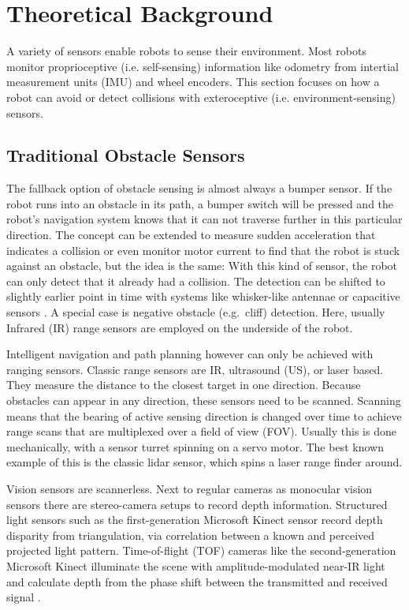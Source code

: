 
\chapter{Theoretical Background}\label{theoretical-background}

A variety of sensors enable robots to sense their environment. Most robots monitor proprioceptive (i.e. self-sensing) information like odometry from intertial measurement units (IMU) and wheel encoders. This section focuses on how a robot can avoid or detect collisions with exteroceptive (i.e. environment-sensing) sensors.

\section{Traditional Obstacle Sensors}\label{traditional-obstacle-sensors}

The fallback option of obstacle sensing is almost always a bumper
sensor. If the robot runs into an obstacle in its path, a bumper switch
will be pressed and the robot's navigation system knows that it can not
traverse further in this particular direction. The concept can be
extended to measure sudden acceleration that indicates a collision or
even monitor motor current to find that the robot is stuck against an
obstacle, but the idea is the same: With this kind of sensor, the robot
can only detect that it already had a collision. The detection can be
shifted to slightly earlier point in time with systems like whisker-like
antennae or capacitive sensors \cite{Muhlbacher-Karrer2015}. A special
case is negative obstacle (e.g.~cliff) detection. Here, usually Infrared
(IR) range sensors are employed on the underside of the robot.

Intelligent navigation and path planning however can only be achieved
with ranging sensors. Classic range sensors are IR, ultrasound (US), or
laser based. They measure the distance to the closest target in one
direction. Because obstacles can appear in any direction, these sensors
need to be scanned. Scanning means that the bearing of active sensing
direction is changed over time to achieve range scans that are
multiplexed over a field of view (FOV). Usually this is done
mechanically, with a sensor turret spinning on a servo motor. The best
known example of this is the classic lidar sensor, which spins a laser
range finder around.

Vision sensors are scannerless. Next to regular cameras as monocular
vision sensors there are stereo-camera setups to record depth
information. Structured light sensors such as the first-generation
Microsoft Kinect sensor record depth disparity from triangulation, via
correlation between a known and perceived projected light pattern.
Time-of-flight (TOF) cameras like the second-generation Microsoft Kinect
illuminate the scene with amplitude-modulated near-IR light and
calculate depth from the phase shift between the transmitted and
received signal \cite{Sarbolandi2015}.

